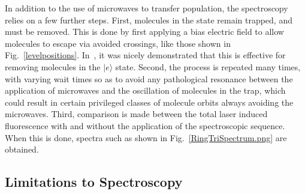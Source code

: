 
In addition to the use of microwaves to transfer population, the spectroscopy relies on a few further steps.
First, molecules in the  state remain trapped, and must be removed.
This is done by first applying a bias electric field to allow molecules to escape via avoided crossings, like those shown in Fig.~\ref{levelpositions}.
In~\cite{Stuhl2012uwave}, it was nicely demonstrated that this is effective for removing molecules in the $|e\rangle$ state.
Second, the process is repeated many times, with varying wait times so as to avoid any pathological resonance between the application of microwaves and the oscillation of molecules in the trap, which could result in certain privileged classes of molecule orbits always avoiding the microwaves.
Third, comparison is made between the total laser induced fluorescence with and without the application of the spectroscopic sequence.
When this is done, spectra such as shown in Fig.~\ref{RingTriSpectrum.png} are obtained.


\subsection{Limitations to Spectroscopy}\label{limitationsection}

